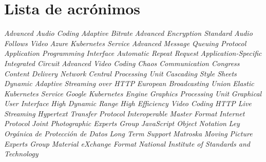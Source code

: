 \newpage
\thispagestyle{fancy}

\chapter*{Lista de acrónimos}

\begin{acronym}[SMPTE]
    {\textit{Advanced Audio Coding}}
    {\textit{Adaptive Bitrate}}
    {\textit{Advanced Encryption Standard}}
    {\textit{Audio Follows Video}}
    {\textit{Azure Kubernetes Service}}
   {\textit{Advanced Message Queuing Protocol}}
    {\textit{Application Programming Interface}}
    {\textit{Automatic Repeat Request}}
   {\textit{Application-Specific Integrated Circuit}}
    {\textit{Advanced Video Coding}}
    {\textit{Chaos Communication Congress}}
    {\textit{Content Delivery Network}}
    {\textit{Central Processing Unit}}
    {\textit{Cascading Style Sheets}}
   {\textit{Dynamic Adaptive Streaming over HTTP}}
    {\textit{European Broadcasting Union}}
    {\textit{Elastic Kubernetes Service}}
    {\textit{Google Kubernetes Engine}}
    {\textit{Graphics Processing Unit}}
    {\textit{Graphical User Interface}}
    {\textit{High Dynamic Range}}
   {\textit{High Efficiency Video Coding}}
    {\textit{HTTP Live Streaming}}
   {\textit{Hypertext Transfer Protocol}}
    {\textit{Interoperable Master Format}}
     {\textit{Internet Protocol}}
   {\textit{Joint Photographic Experts Group}}
   {\textit{JavaScript Object Notation}}
   {\textit{Ley Orgánica de Protección de Datos}}
    {\textit{Long Term Support}}
    {\textit{Matroska}}
   {\textit{Moving Picture Experts Group}}
    {\textit{Material eXchange Format}}
   {\textit{National Institute of Standards and Technology}}

\end{acronym}
